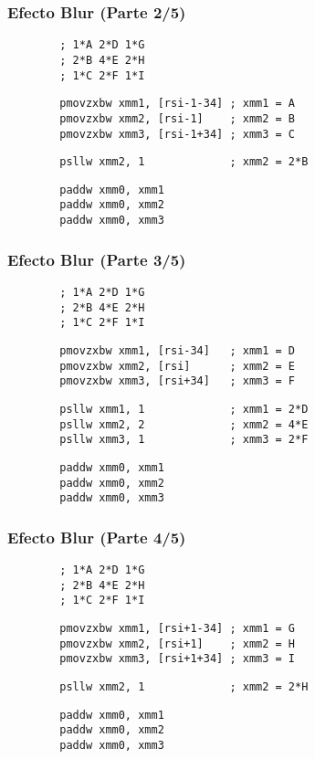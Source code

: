 \documentclass[aspectratio=169]{beamer}
\begin{document}
\begin{frame}[fragile,t]
    \frametitle{Efecto Blur (Parte 2/5)}
    \small
\begin{verbatim}
        ; 1*A 2*D 1*G
        ; 2*B 4*E 2*H
        ; 1*C 2*F 1*I
\end{verbatim}
\pause
\begin{verbatim}
        pmovzxbw xmm1, [rsi-1-34] ; xmm1 = A
        pmovzxbw xmm2, [rsi-1]    ; xmm2 = B
        pmovzxbw xmm3, [rsi-1+34] ; xmm3 = C
\end{verbatim}
\pause
\begin{verbatim}
        psllw xmm2, 1             ; xmm2 = 2*B
\end{verbatim}
\pause
\begin{verbatim}
        paddw xmm0, xmm1
        paddw xmm0, xmm2
        paddw xmm0, xmm3
\end{verbatim}
\end{frame}

\begin{frame}[fragile,t]
    \frametitle{Efecto Blur (Parte 3/5)}
    \small
\begin{verbatim}
        ; 1*A 2*D 1*G
        ; 2*B 4*E 2*H
        ; 1*C 2*F 1*I
\end{verbatim}
\pause
\begin{verbatim}
        pmovzxbw xmm1, [rsi-34]   ; xmm1 = D
        pmovzxbw xmm2, [rsi]      ; xmm2 = E
        pmovzxbw xmm3, [rsi+34]   ; xmm3 = F
\end{verbatim}
\pause
\begin{verbatim}
        psllw xmm1, 1             ; xmm1 = 2*D
        psllw xmm2, 2             ; xmm2 = 4*E
        psllw xmm3, 1             ; xmm3 = 2*F
\end{verbatim}
\pause
\begin{verbatim}
        paddw xmm0, xmm1
        paddw xmm0, xmm2
        paddw xmm0, xmm3
\end{verbatim}
\end{frame}

\begin{frame}[fragile,t]
    \frametitle{Efecto Blur (Parte 4/5)}
    \small
\begin{verbatim}
        ; 1*A 2*D 1*G
        ; 2*B 4*E 2*H
        ; 1*C 2*F 1*I
\end{verbatim}
\pause
\begin{verbatim}
        pmovzxbw xmm1, [rsi+1-34] ; xmm1 = G
        pmovzxbw xmm2, [rsi+1]    ; xmm2 = H
        pmovzxbw xmm3, [rsi+1+34] ; xmm3 = I
\end{verbatim}
\pause
\begin{verbatim}
        psllw xmm2, 1             ; xmm2 = 2*H
\end{verbatim}
\pause
\begin{verbatim}
        paddw xmm0, xmm1
        paddw xmm0, xmm2
        paddw xmm0, xmm3
\end{verbatim}
\end{frame}
\end{document}
